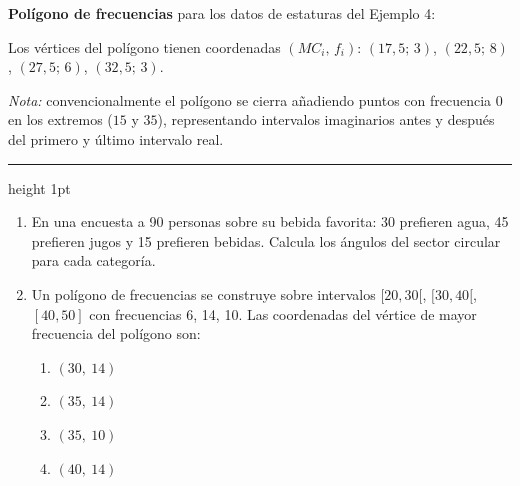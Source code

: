 \documentclass[11pt, letterpaper]{article}
\newcommand{\subbloque}[1]{%
  \vspace{14pt}
  \noindent{\large\bfseries\color{zenitnavy} #1}\par
  \vspace{4pt}\hrule height 1pt\vspace{8pt}}
\begin{document}
\begin{tcolorbox}[examplebox, title={Ej. 6. Gráfico circular y polígono de frecuencias}]
\textbf{Polígono de frecuencias} para los datos de estaturas del Ejemplo 4:

Los vértices del polígono tienen coordenadas $(MC_i,\, f_i)$: $(17{,}5;\, 3)$, $(22{,}5;\, 8)$, $(27{,}5;\, 6)$, $(32{,}5;\, 3)$.

\begin{center}
\end{center}

\textit{Nota:} convencionalmente el polígono se cierra añadiendo puntos con frecuencia 0 en los extremos ($15$ y $35$), representando intervalos imaginarios antes y después del primero y último intervalo real.
\end{tcolorbox}

\subbloque{Práctica inmediata 3.2}

\begin{enumerate}[label=\textbf{\arabic*.}, leftmargin=*]
  \item En una encuesta a 90 personas sobre su bebida favorita: 30 prefieren agua, 45 prefieren jugos y 15 prefieren bebidas. Calcula los ángulos del sector circular para cada categoría.

  \item Un polígono de frecuencias se construye sobre intervalos $[20,30[$, $[30,40[$, $[40,50]$ con frecuencias 6, 14, 10. Las coordenadas del vértice de mayor frecuencia del polígono son:
  \begin{enumerate}[label=\Alph*),leftmargin=14pt]
    \item $(30,\ 14)$
    \item $(35,\ 14)$
    \item $(35,\ 10)$
    \item $(40,\ 14)$
  \end{enumerate}
\end{enumerate}
\end{document}
